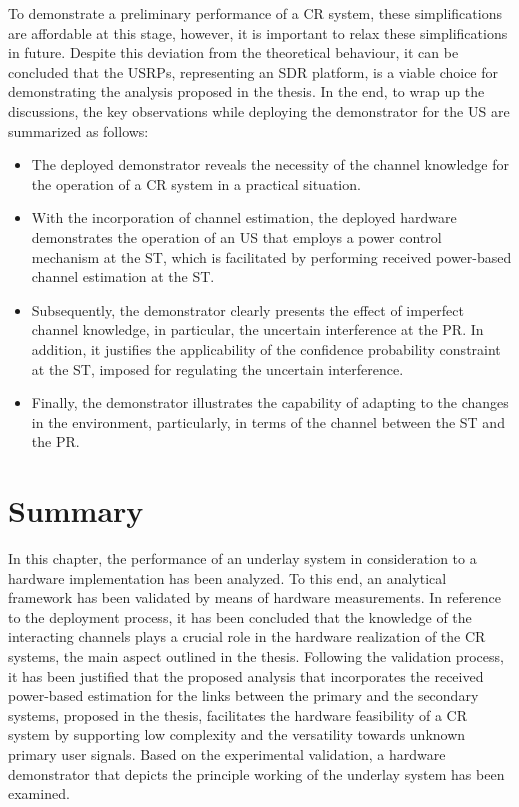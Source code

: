 To demonstrate a preliminary performance of a CR system, these simplifications are affordable at this stage, however, it is important to relax these simplifications in future. 
Despite this deviation from the theoretical behaviour, it can be concluded that the USRPs, representing an SDR platform, is a viable choice for demonstrating the analysis proposed in the thesis. 
In the end, to wrap up the discussions, the key observations while deploying the demonstrator for the US are summarized as follows: \begin{itemize} \item The deployed demonstrator reveals the necessity of the channel knowledge for the operation of a CR system in a practical situation. \item With the incorporation of channel estimation, the deployed hardware demonstrates the operation of an US that employs a power control mechanism at the ST, which is facilitated by performing received power-based channel estimation at the ST. \item Subsequently, the demonstrator clearly presents the effect of imperfect channel knowledge, in particular, the uncertain interference at the PR. In addition, it justifies the applicability of the confidence probability constraint at the ST, imposed for regulating the uncertain interference. 
\item Finally, the demonstrator illustrates the capability of adapting to the changes in the environment, particularly, in terms of the channel between the ST and the PR.  \end{itemize}

\section{Summary}
\label{con}

In this chapter, the performance of an underlay system in consideration to a hardware implementation has been analyzed. To this end, an analytical framework has been validated by means of hardware measurements. 
In reference to the deployment process, it has been concluded that the knowledge of the interacting channels plays a crucial role in the hardware realization of the CR systems, the main aspect outlined in the thesis. Following the validation process, it has been justified that the proposed analysis that incorporates the received power-based estimation for the links between the primary and the secondary systems, proposed in the thesis, facilitates the hardware feasibility of a CR system by supporting low complexity and the versatility towards unknown primary user signals. Based on the experimental validation, a hardware demonstrator that depicts the principle working of the underlay system has been examined. 

